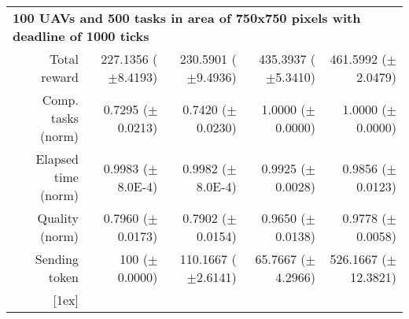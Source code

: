 \begin{table}
\begin{tabular}{rrrrr}
		\multicolumn{5}{l}{\textbf{100 UAVs and 500 tasks in area of 750x750 pixels with deadline of 1000 ticks}} \\
		Total reward           &  227.1356  ($\pm$8.4193)    &  230.5901  ($\pm$9.4936) &  435.3937 ($\pm$5.3410)    &  461.5992  ($\pm$2.0479)  \\
		Comp. tasks (norm)     &  0.7295    ($\pm$0.0213)    &  0.7420    ($\pm$0.0230) &  1.0000   ($\pm$0.0000)    &  1.0000    ($\pm$0.0000) \\ 
		Elapsed time (norm)    &  0.9983    ($\pm$8.0E-4)    &  0.9982    ($\pm$8.0E-4) &  0.9925   ($\pm$0.0028)    &  0.9856    ($\pm$0.0123)  \\ 
		Quality (norm)         &  0.7960    ($\pm$0.0173)    &  0.7902    ($\pm$0.0154) &  0.9650   ($\pm$0.0138)    &  0.9778    ($\pm$0.0058) \\ 
		Sending token          &  100       ($\pm$0.0000)    &  110.1667  ($\pm$2.6141) &  65.7667  ($\pm$4.2966)    &  526.1667  ($\pm$12.3821)  \\ 
		[1ex]	\hline
	\end{tabular}
\end{table} 